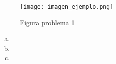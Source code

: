 \noindent \lipsum[1][1-9]

\begin{figure}[H]
    \centering
    \texttt{[image: imagen\_ejemplo.png]}
    \caption{Figura problema 1}
    \label{fig:shepp_logan}
\end{figure}

\begin{enumerate}[a)]
    \item \lipsum[2][2]
    \item \lipsum[3][3]
    \item \lipsum[4][4]
\end{enumerate}